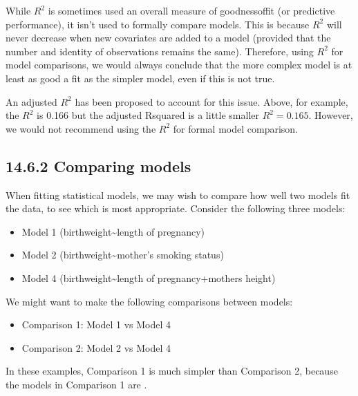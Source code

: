 \documentclass[letterpaper,10pt,english]{jupyterBook}
\begin{document}
\sphinxAtStartPar
While \(R^2\) is sometimes used an overall measure of goodness\sphinxhyphen{}of\sphinxhyphen{}fit (or predictive performance), it isn’t used to formally compare models. This is because \(R^2\) will never decrease when new covariates are added to a model (provided that the number and identity of observations remains the same). Therefore, using \(R^2\) for model comparisons, we would always conclude that the more complex model is at least as good a fit as the simpler model, even if this is not true.

\sphinxAtStartPar
An adjusted \(R^2\) has been proposed to account for this issue. Above, for example, the \(R^2\) is 0.166 but the adjusted R\sphinxhyphen{}squared is a little smaller \(R^2 = 0.165\). However, we would not recommend using the \(R^2\) for formal model comparison.


\subsection{14.6.2 Comparing models}
\label{\detokenize{14.g. Linear Regression III:comparing-models}}
\sphinxAtStartPar
When fitting statistical models, we may wish to compare how well two models fit the data, to see which is most appropriate. Consider the following three models:
\begin{itemize}
\item {} 
\sphinxAtStartPar
Model 1 (birthweight\textasciitilde{}length of pregnancy)

\item {} 
\sphinxAtStartPar
Model 2 (birthweight\textasciitilde{}mother’s smoking status)

\item {} 
\sphinxAtStartPar
Model 4 (birthweight\textasciitilde{}length of pregnancy+mothers height)

\end{itemize}

\sphinxAtStartPar
We might want to make the following comparisons between models:
\begin{itemize}
\item {} 
\sphinxAtStartPar
Comparison 1: Model 1 vs Model 4

\item {} 
\sphinxAtStartPar
Comparison 2: Model 2 vs Model 4

\end{itemize}

\sphinxAtStartPar
In these examples, Comparison 1 is much simpler than Comparison 2, because the models in Comparison 1 are .
\end{document}
